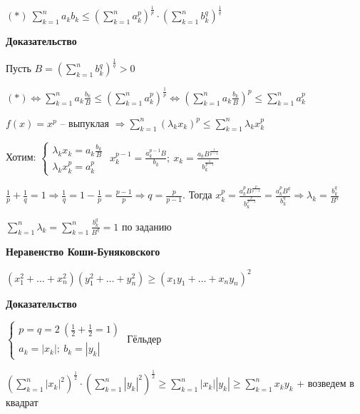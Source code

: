 \documentclass[14pt, letter paper]{article}
\begin{document}
$(*)\ \sum\limits_{k = 1}^n a_k b_k \leq (\sum\limits_{k = 1}^n a_k^p)^\frac{1}{p} \cdot (\sum\limits_{k = 1}^n b_k^q)^\frac{1}{q}$

\begin{center}
    \textbf{Доказательство}
\end{center}

Пусть $B = (\sum\limits_{k = 1}^n b_k^q)^\frac{1}{q} > 0$

$(*) \Leftrightarrow \sum\limits_{k = 1}^n a_k \frac{b_k}{B} \leq (\sum\limits_{k = 1}^n a_k^p)^\frac{1}{p} \Leftrightarrow (\sum\limits_{k = 1}^n a_k \frac{b_k}{B})^p \leq \sum\limits_{k = 1}^n a_k^p$

$f(x) = x^p$ -- выпуклая $\Rightarrow \sum\limits_{k = 1}^n (\lambda_k x_k)^p \leq \sum\limits_{k = 1}^n \lambda_k x_k^p$

Хотим: $\begin{cases}
    \lambda_k x_k = a_k \frac{b_k}{B} \\
    \lambda_k x_k^p = a_k^p
\end{cases}$ $x_k^{p - 1} = \frac{a_k^{p - 1} B}{b_k};\ x_k = \frac{a_k B^\frac{1}{p - 1}}{b_k^\frac{1}{p - 1}}$

$\frac{1}{p} + \frac{1}{q} = 1 \Rightarrow \frac{1}{q} = 1 - \frac{1}{p} = \frac{p - 1}{p} \Rightarrow q = \frac{p}{p - 1}$. Тогда $x_k^p = \frac{a_k^p B^\frac{p}{p - 1}}{b_k^\frac{p}{p - 1}} = \frac{a_k^p B^q}{b_k^q} \Rightarrow \lambda_k = \frac{b_k^q}{B^q}$

$\sum\limits_{k = 1}^n \lambda_k = \sum\limits_{k = 1}^n \frac{b_k^q}{B^q} = 1$ по заданию

\vspace{5mm}

\textbf{Неравенство Коши-Буняковского}

$(x_1^2 + \ldots + x_n^2)(y_1^2 + \ldots + y_n^2) \geq (x_1y_1 + \ldots + x_ny_n)^2$

\begin{center}
    \textbf{Доказательство}
\end{center}

$\begin{cases}
    p = q = 2\ (\frac{1}{2} + \frac{1}{2} = 1) \\
    a_k = |x_k|;\ b_k = |y_k|
\end{cases}$ Гёльдер

$(\sum\limits_{k = 1}^n |x_k|^2)^\frac{1}{2} \cdot (\sum\limits_{k = 1}^n |y_k|^2)^\frac{1}{2} \geq \sum\limits_{k = 1}^n |x_k||y_k| \geq \sum\limits_{k = 1}^n x_ky_k$ + возведем в квадрат
\end{document}
